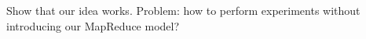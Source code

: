 
\label {fs-experiments}

Show that our idea works. Problem: how to perform experiments without introducing our MapReduce model?
